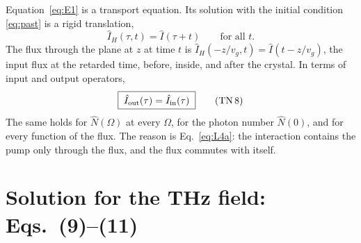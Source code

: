 \documentclass[aps,pra,onecolumn,notitlepage,11pt,amsmath,amssymb,nofootinbib]{revtex4-2}
\newcommand{\Nop}{\hat N}
\newcommand{\Iop}{\hat I}
\newcommand{\TN}[1]{\text{TN\,#1}}
\begin{document}
Equation~\eqref{eq:E1} is a transport equation. Its solution with the initial
condition \eqref{eq:past} is a rigid translation,
\begin{equation}
\Iop_H(\tau,t)=\Iop(\tau+t)\qquad\text{for all }t.
\label{eq:fluxsol}
\end{equation}
The flux through the plane at $z$ at time $t$ is
$\Iop_H(-z/v_g,t)=\Iop(t-z/v_g)$, the input flux at the retarded time, before,
inside, and after the crystal. In terms of input and output operators,
\begin{equation}
\boxed{\;\Iop_{\rm out}(\tau)=\Iop_{\rm in}(\tau)\;}
\tag{\TN{8}}
\end{equation}
The same holds for $\Nop(\Omega)$ at every $\Omega$, for the photon number
$\Nop(0)$, and for every function of the flux. The reason is
Eq.~\eqref{eq:L4a}: the interaction contains the pump only through the flux,
and the flux commutes with itself.

\section{Solution for the THz field: Eqs.~(9)--(11)}
\label{sec:thz}
\end{document}
